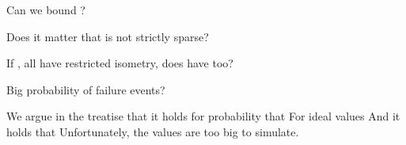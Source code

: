 {
\I Can we bound ?

\I Does it matter that  is not strictly sparse?

\I If , all have restricted isometry, does  have too?

\I Big  probability of failure events?
}
{
\I We argue in the treatise that it holds for probability  that
%
\I For ideal values
%
\I And it holds that
%
\I Unfortunately, the values are too big to simulate.
}



